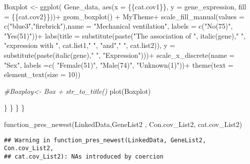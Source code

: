 \documentclass[
]{article}
\newenvironment{Shaded}{\begin{snugshade}}{\end{snugshade}}
\newcommand{\AttributeTok}[1]{\textcolor[rgb]{0.77,0.63,0.00}{#1}}
\newcommand{\CommentTok}[1]{\textcolor[rgb]{0.56,0.35,0.01}{\textit{#1}}}
\newcommand{\DecValTok}[1]{\textcolor[rgb]{0.00,0.00,0.81}{#1}}
\newcommand{\FunctionTok}[1]{\textcolor[rgb]{0.00,0.00,0.00}{#1}}
\newcommand{\NormalTok}[1]{#1}
\newcommand{\OtherTok}[1]{\textcolor[rgb]{0.56,0.35,0.01}{#1}}
\newcommand{\SpecialCharTok}[1]{\textcolor[rgb]{0.00,0.00,0.00}{#1}}
\newcommand{\StringTok}[1]{\textcolor[rgb]{0.31,0.60,0.02}{#1}}
\begin{document}
\begin{Shaded}
\begin{Highlighting}[]
\NormalTok{Boxplot }\OtherTok{\textless{}{-}} \FunctionTok{ggplot}\NormalTok{( Gene\_data, }\FunctionTok{aes}\NormalTok{(}\AttributeTok{x =}\NormalTok{ \{\{cat.cov1\}\}, }\AttributeTok{y =}\NormalTok{ gene\_expression, }\AttributeTok{fill =}\NormalTok{ \{\{cat.cov2\}\}))}\SpecialCharTok{+}
  \FunctionTok{geom\_boxplot}\NormalTok{() }\SpecialCharTok{+}
\NormalTok{  MyTheme}\SpecialCharTok{+}
  \FunctionTok{scale\_fill\_manual}\NormalTok{(}\AttributeTok{values =} \FunctionTok{c}\NormalTok{(}\StringTok{"blue3"}\NormalTok{,}\StringTok{"firebrick"}\NormalTok{),}\AttributeTok{name =} \StringTok{"Mechanical ventilation"}\NormalTok{, }\AttributeTok{labels =} \FunctionTok{c}\NormalTok{(}\StringTok{"No(75)"}\NormalTok{, }\StringTok{"Yes(51)"}\NormalTok{))}\SpecialCharTok{+}
  \FunctionTok{labs}\NormalTok{(}\AttributeTok{title =} \FunctionTok{substitute}\NormalTok{(}\FunctionTok{paste}\NormalTok{(}\StringTok{"The association of "}\NormalTok{, }\FunctionTok{italic}\NormalTok{(gene),}\StringTok{" "}\NormalTok{, }\StringTok{"expression with "}\NormalTok{, cat.list1,}\StringTok{" "}\NormalTok{, }\StringTok{"and"}\NormalTok{,}\StringTok{" "}\NormalTok{, cat.list2)), }\AttributeTok{y =} \FunctionTok{substitute}\NormalTok{(}\FunctionTok{paste}\NormalTok{(}\FunctionTok{italic}\NormalTok{(gene),}\StringTok{" "}\NormalTok{, }\StringTok{"Expression"}\NormalTok{)))}\SpecialCharTok{+}
  \FunctionTok{scale\_x\_discrete}\NormalTok{(}\AttributeTok{name =} \StringTok{"Sex"}\NormalTok{, }\AttributeTok{labels =}\FunctionTok{c}\NormalTok{( }\StringTok{"Female(51)"}\NormalTok{, }\StringTok{"Male(74)"}\NormalTok{, }\StringTok{"Unknown(1)"}\NormalTok{))}\SpecialCharTok{+}
  \FunctionTok{theme}\NormalTok{(}\AttributeTok{text =} \FunctionTok{element\_text}\NormalTok{(}\AttributeTok{size =} \DecValTok{10}\NormalTok{))}

\CommentTok{\#Boxploy\textless{}{-} Box + str\_to\_title()}
\FunctionTok{plot}\NormalTok{(Boxplot)}
    
\NormalTok{  \}}
\NormalTok{\}}
\NormalTok{  \}}
\NormalTok{\}}

\FunctionTok{function\_pres\_newest}\NormalTok{(LinkedData,GeneList2 , Con.cov\_List2, cat.cov\_List2)}
\end{Highlighting}
\end{Shaded}

\begin{verbatim}
## Warning in function_pres_newest(LinkedData, GeneList2, Con.cov_List2,
## cat.cov_List2): NAs introduced by coercion
\end{verbatim}
\end{document}
